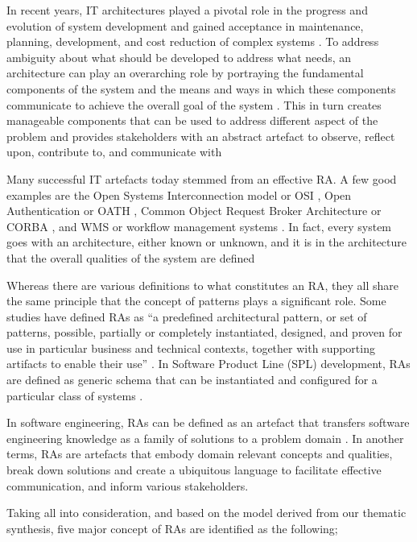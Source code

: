 \documentclass{ieeeaccess}
\begin{document}
In recent years, IT architectures played a pivotal role in the progress and evolution of system development and gained acceptance in maintenance, planning, development, and cost reduction of complex systems \cite{martinez2015solid}. To address ambiguity about what should be developed to address what needs, an architecture can play an overarching role by portraying the fundamental components of the system and the means and ways in which these components communicate to achieve the overall goal of the system \cite{Sievi-Korte}. This in turn creates manageable components that can be used to address different aspect of the problem and provides stakeholders with an abstract artefact to observe, reflect upon, contribute to, and communicate with \cite{kohler2019towards}

Many successful IT artefacts today stemmed from an effective RA. A few good examples are the Open Systems Interconnection model or OSI \cite{zimmermann1980osi}, Open Authentication or OATH \cite{OATH}, Common Object Request Broker Architecture or CORBA \cite{pope1998corba}, and WMS or workflow management systems \cite{greefhorst1999een}. In fact, every system goes with an architecture, either known or unknown, and it is in the architecture that the overall qualities of the system are defined

Whereas there are various definitions to what constitutes an RA, they all share the same principle that the concept of patterns plays a significant role. Some studies have defined RAs as “a predefined architectural pattern, or set of patterns, possible, partially or completely instantiated, designed, and proven for use in particular business and technical contexts, together with supporting artifacts to enable their use” \cite{Cloutier}. In Software Product Line (SPL) development, RAs are defined as generic schema that can be instantiated and configured for a particular class of systems \cite{Derras}.

In software engineering, RAs can be defined as an artefact that transfers software engineering knowledge as a family of solutions to a problem domain \cite{Klein}. In another terms, RAs are artefacts that embody domain relevant concepts and qualities, break down solutions and create a ubiquitous language to facilitate effective communication, and inform various stakeholders. 

Taking all into consideration, and based on the model derived from our thematic synthesis, five major concept of RAs are identified as the following; 
\end{document}
